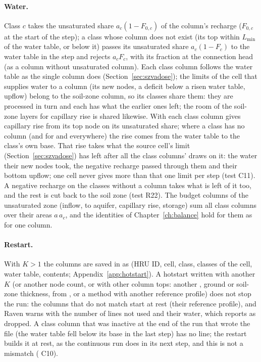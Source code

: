 \paragraph{Water.} Class $c$ takes the unsaturated share $a_c(1-F_{0,c})$ of the column's recharge ($F_{0,c}$ at the
start of the step); a class whose column does not exist (its top within $L_{\min}$ of the water table, or below it)
passes its unsaturated share $a_c(1-F_c)$ to the water table in the step and rejects $a_c F_c$, with its fraction at the
connection head (as a column without unsaturated column). Each class column follows the water table as the single
column does (Section~\ref{sec:szvadose}); the limits of the cell that supplies water to a column (its new nodes, a deficit
below a risen water table, upflow) belong to the soil-zone column, so its classes share them: they are processed in
turn and each has what the earlier ones left; the room of the soil-zone layers for capillary rise is shared likewise.
With  each class column gives capillary rise from its top node on its unsaturated share; where a class has
no column (and for  and  everywhere) the rise comes from the water table to the class's own base.
That rise takes what the source cell's limit (Section~\ref{sec:szvadose}) has left after all the class columns' draws on
it: the water their new nodes took, the negative recharge passed through them and their bottom upflow; one cell never
gives more than that one limit per step (test C11). A negative recharge on the classes without a column takes what is
left of it too, and the rest is cut back to the soil zone (test R22).
The budget columns of the unsaturated zone (inflow, to aquifer, capillary rise, storage) sum all class columns over
their areas $a\,a_c$, and the identities of Chapter~\ref{ch:balance} hold for them as for one column.

\paragraph{Restart.} With $K>1$ the columns are saved in  as  (HRU ID, cell,
class, classes of the cell, water table, contents; Appendix~\ref{app:hotstart}). A hotstart written with another $K$
(or another node count, or with other column tops: another , ground or soil-zone thickness, from
, or a method with another reference profile) does not stop the run: the columns that do not
match start at rest (their reference profile), and Raven warns with the number of lines not used and their water, which
 reports as dropped. A class column that was inactive at the end of the run that wrote the file (the water table fell below
its base in the last step) has no line; the restart builds it at rest, as the continuous run does in its next step, and
this is not a mismatch ( C10).

